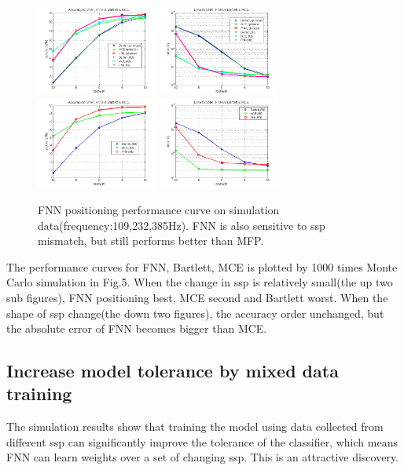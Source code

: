 \begin{figure}
\includegraphics[width=4cm,height=3cm]{figure/Accuracy_to_SNR_FNN_vs_Bartlett_MCE}
\includegraphics[width=4cm,height=3cm]{figure/Error_to_SNR_FNN_vs_Bartlett_MCE}
\includegraphics[width=4cm,height=3cm]{figure/Accuracy_to_SNR_FNN_vs_Bartlett_MCE_i906}
\includegraphics[width=4cm,height=3cm]{figure/Error_to_SNR_FNN_vs_Bartlett_MCE_i906}
\caption{FNN positioning performance curve on simulation data(frequency:109,232,385Hz).
 FNN is also sensitive to ssp mismatch, but still performs better than MFP.
}
\end{figure}

 The performance curves for FNN, Bartlett, MCE is plotted by 1000 times Monte Carlo simulation in Fig.5. When the change in ssp is relatively small(the up two sub figures), FNN positioning best, MCE second and Bartlett worst.
 When the shape of ssp change(the down two figures), the accuracy order unchanged, but the absolute error of FNN becomes bigger than MCE.


\subsection{%
Increase model tolerance by mixed data training}
The simulation results show that training the model using data collected from different ssp can significantly improve the tolerance of the classifier, which means FNN can learn weights over a set of changing ssp. This is an attractive discovery.

